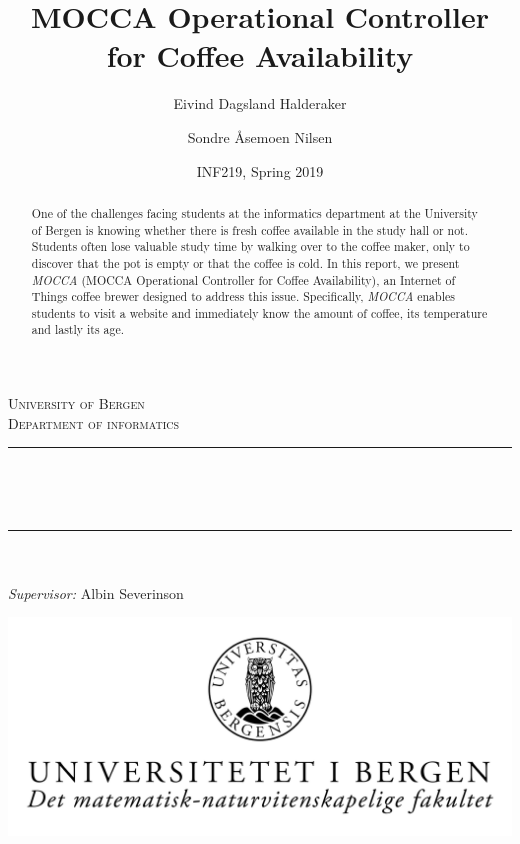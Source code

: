 \documentclass[12pt,a4paper,oneside,article]{memoir}
\title{MOCCA Operational Controller for Coffee Availability}
\author{Eivind Dagsland Halderaker \and Sondre Åsemoen Nilsen}
\date{INF219, Spring 2019}
\numberwithin{equation}{chapter}
\begin{document}
\begin{titlingpage}

\newcommand{\HRule}{\rule{\linewidth}{0.5mm}}
\centering

\textsc{\LARGE University of Bergen \\ Department of informatics}\\[1.5cm] %

\HRule\\[0.5cm]
\begin{Huge}
	\bfseries{\thetitle}\\[0.7cm]
\end{Huge}
\HRule\\[0.5cm]

{\large \theauthor}\\
{\large \emph{Supervisor:} Albin Severinson\\[2cm]}

\centerline{\includegraphics[scale=1.9]{figures/canvasWithFaculty}}
{\large \thedate}\\[3cm]
\vfill

\begin{abstract}
One of the challenges facing students at the informatics department at the 
University of Bergen is knowing whether there is fresh coffee available in the 
study hall or not.  Students often lose valuable study time by walking over to 
the coffee maker, only to discover that the pot is empty or that the coffee is 
cold. In this report, we present \textit{MOCCA} (MOCCA Operational Controller 
for Coffee Availability), an Internet of Things coffee brewer designed to 
address this issue. Specifically, \textit{MOCCA} enables students to visit a 
website and immediately know the amount of coffee, its temperature and lastly 
its age.
\end{abstract}
\end{titlingpage}

\clearpage
\end{document}

